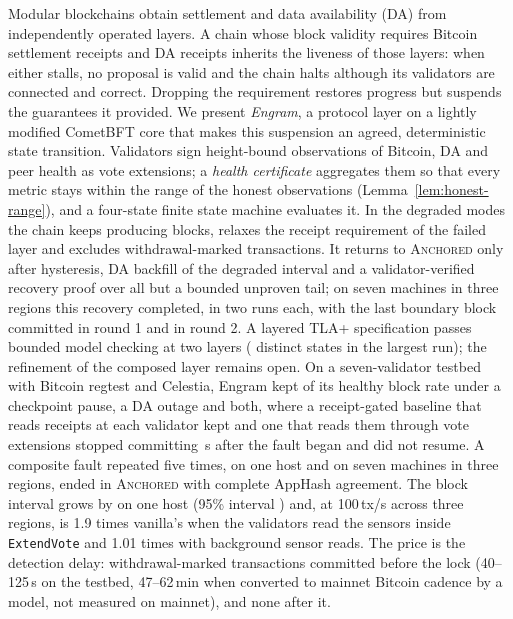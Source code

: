 Modular blockchains obtain settlement and data availability (DA) from
independently operated layers. A chain whose block validity requires Bitcoin
settlement receipts and DA receipts inherits the liveness of those layers: when
either stalls, no proposal is valid and the chain halts although its validators
are connected and correct. Dropping the requirement restores progress but
suspends the guarantees it provided. We present \emph{Engram}, a protocol layer
on a lightly modified CometBFT core that makes this suspension an agreed,
deterministic state transition. Validators sign height-bound observations of
Bitcoin, DA and peer health as vote extensions; a \emph{health certificate}
aggregates them so that every metric stays within the range of the honest
observations (Lemma~\ref{lem:honest-range}), and a four-state finite state machine
evaluates it. In the degraded modes the chain keeps producing blocks, relaxes the
receipt requirement of the failed layer and excludes withdrawal-marked
transactions. It returns to \textsc{Anchored} only after hysteresis, DA backfill of the
degraded interval and a validator-verified recovery proof over all but a bounded
unproven tail; on seven machines in three regions this recovery completed, in two runs each, with the last boundary block committed in round 1 and in round 2. A layered TLA+ specification passes bounded model checking at two
layers (\resFSMStatesM{} distinct states in the largest run); the refinement of the
composed layer remains open. On a seven-validator testbed with Bitcoin regtest and
Celestia, Engram kept \resRQTwoEngram{} of its healthy block rate under a checkpoint
pause, a DA outage and both, where a receipt-gated baseline that reads receipts at each
validator kept \resRQTwoOob{} and one that reads them through vote extensions stopped
committing \resInBandHalt\,s after the fault began and did not resume. A composite
fault repeated five times, on one host and on seven machines in three regions, ended in
\textsc{Anchored} with complete AppHash agreement. The block interval grows by
\resOverheadPct{} on one host (95\% interval \resOverheadCI{}) and, at 100\,tx/s across three regions, is 1.9 times
vanilla's when the validators read the sensors inside \texttt{ExtendVote} and 1.01 times with background sensor reads. The price is the detection delay: \resExposure{}
withdrawal-marked transactions committed before the lock (40--125\,s on the testbed,
47--62\,min when converted to mainnet Bitcoin cadence by a model, not measured on mainnet), and none after it.
